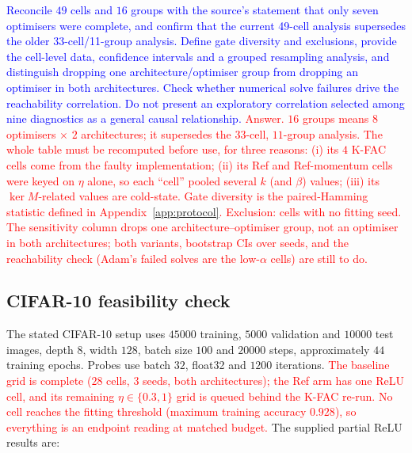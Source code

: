 \documentclass{article}
\newcommand{\zied}[1]{\textcolor{blue}{#1}}
\newcommand{\nat}[1]{\textcolor{red}{#1}}
\theoremstyle{definition}
\theoremstyle{remark}
\begin{document}
\zied{Reconcile $49$ cells and $16$ groups with the source's statement that only seven optimisers were complete, and confirm that the current 49-cell analysis supersedes the older 33-cell/11-group analysis. Define gate diversity and exclusions, provide the cell-level data, confidence intervals and a grouped resampling analysis, and distinguish dropping one architecture/optimiser group from dropping an optimiser in both architectures. Check whether numerical solve failures drive the reachability correlation. Do not present an exploratory correlation selected among nine diagnostics as a general causal relationship.}
\nat{Answer. $16$ groups means $8$ optimisers $\times$ $2$ architectures; it supersedes the $33$-cell, $11$-group analysis. The whole table must be recomputed before use, for three reasons: (i) its $4$ K-FAC cells come from the faulty implementation; (ii) its Ref and Ref-momentum cells were keyed on $\eta$ alone, so each ``cell'' pooled several $k$ (and $\beta$) values; (iii) its $\ker M$-related values are cold-state. Gate diversity is the paired-Hamming statistic defined in Appendix~\ref{app:protocol}. Exclusion: cells with no fitting seed. The sensitivity column drops one architecture--optimiser group, not an optimiser in both architectures; both variants, bootstrap CIs over seeds, and the reachability check (Adam's failed solves are the low-$\alpha$ cells) are still to do.}

\subsection{CIFAR-10 feasibility check}\label{app:e19}

The stated CIFAR-10 setup uses $45000$ training, $5000$ validation and $10000$ test images, depth $8$, width $128$, batch size $100$ and $20000$ steps, approximately $44$ training epochs. Probes use batch $32$, float32 and $1200$ iterations. \nat{The baseline grid is complete ($28$ cells, $3$ seeds, both architectures); the Ref arm has one ReLU cell, and its remaining $\eta\in\{0.3,1\}$ grid is queued behind the K-FAC re-run. No cell reaches the fitting threshold (maximum training accuracy $0.928$), so everything is an endpoint reading at matched budget.} The supplied partial ReLU results are:
\end{document}

